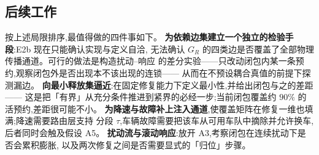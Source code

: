 \documentclass[manuscript,screen,review]{acmart}
\newcommand{\ClosureAliveFrac}{90\%}
\begin{document}
\subsection{后续工作}
\label{sec:future}

按上述局限排序,最值得做的四件事如下。
\textbf{为依赖边集建立一个独立的检验手段}:E2b 现在只能确认实现与定义自洽,
无法确认 \(G_R\) 的四类边是否覆盖了全部物理传播通道。可行的做法是构造扰动--响应
的差分实验——只改动闭包内某一条预约,观察闭包外是否出现本不该出现的连锁——
从而在不预设耦合真值的前提下探测漏边。
\textbf{向最小释放集逼近}:在固定修复能力下定义最小性,并给出闭包与之的差距——
这是把「有界」从充分条件推进到紧界的必经一步;当前闭包覆盖约
\(\ClosureAliveFrac\) 的活预约,差距很可能不小。
\textbf{为降速与故障补上注入通道},使覆盖矩阵在修复一维也填满;降速需要路由层支持
分段 \(\tau\),车辆故障需要把该车从可用车队中摘除并允许换车,后者同时会触及假设 A5。
\textbf{扰动流与滚动响应}:放开 A3,考察闭包在连续扰动下是否会累积膨胀,
以及两次修复之间是否需要显式的「归位」步骤。



\end{document}
